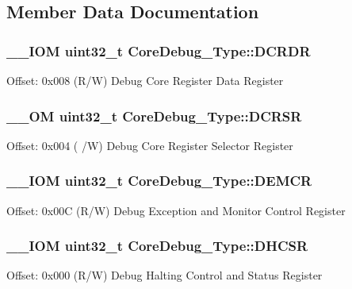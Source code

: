 \subsection{Member Data Documentation}
\hypertarget{struct_core_debug___type_aab3cc92ef07bc1f04b3a3aa6db2c2d55}{
\subsubsection[{D\-C\-R\-D\-R}]{\setlength{\rightskip}{0pt plus 5cm}\-\_\-\-\_\-\-I\-O\-M uint32\-\_\-t Core\-Debug\-\_\-\-Type\-::\-D\-C\-R\-D\-R}}\label{struct_core_debug___type_aab3cc92ef07bc1f04b3a3aa6db2c2d55}
Offset\-: 0x008 (R/\-W) Debug Core Register Data Register \hypertarget{struct_core_debug___type_af907cf64577eaf927dac6787df6dd98b}{
\subsubsection[{D\-C\-R\-S\-R}]{\setlength{\rightskip}{0pt plus 5cm}\-\_\-\-\_\-\-O\-M uint32\-\_\-t Core\-Debug\-\_\-\-Type\-::\-D\-C\-R\-S\-R}}\label{struct_core_debug___type_af907cf64577eaf927dac6787df6dd98b}
Offset\-: 0x004 ( /\-W) Debug Core Register Selector Register \hypertarget{struct_core_debug___type_aeb3126abc4c258a858f21f356c0df6ee}{
\subsubsection[{D\-E\-M\-C\-R}]{\setlength{\rightskip}{0pt plus 5cm}\-\_\-\-\_\-\-I\-O\-M uint32\-\_\-t Core\-Debug\-\_\-\-Type\-::\-D\-E\-M\-C\-R}}\label{struct_core_debug___type_aeb3126abc4c258a858f21f356c0df6ee}
Offset\-: 0x00\-C (R/\-W) Debug Exception and Monitor Control Register \hypertarget{struct_core_debug___type_ad63554e4650da91a8e79929cbb63db66}{
\subsubsection[{D\-H\-C\-S\-R}]{\setlength{\rightskip}{0pt plus 5cm}\-\_\-\-\_\-\-I\-O\-M uint32\-\_\-t Core\-Debug\-\_\-\-Type\-::\-D\-H\-C\-S\-R}}\label{struct_core_debug___type_ad63554e4650da91a8e79929cbb63db66}
Offset\-: 0x000 (R/\-W) Debug Halting Control and Status Register 

